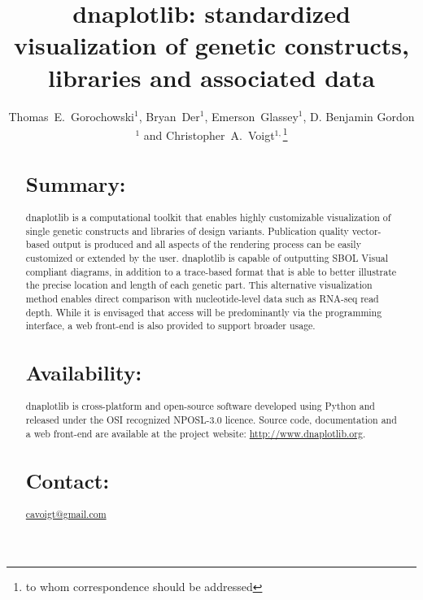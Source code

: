 \documentclass{bioinfo}
\begin{document}

\title[dnaplotlib]{dnaplotlib: standardized visualization of genetic constructs, libraries and associated data}
\author[Thomas E. Gorochowski \textit{et~al.}]{Thomas~E.~Gorochowski$^{1}$, Bryan~Der$^{1}$, Emerson~Glassey$^{1}$, D. Benjamin Gordon$^{1}$ and Christopher~A.~Voigt$^{1,}$\footnote{to whom correspondence should be addressed}}
\address{$^{1}$Department of Biological Engineering, Synthetic Biology Center, Massachusetts Institute of Technology, USA.}



\maketitle

\begin{abstract}

\section{Summary:}
dnaplotlib is a computational toolkit that enables highly customizable visualization of single genetic constructs and libraries of design variants. Publication quality vector-based output is produced and all aspects of the rendering process can be easily customized or extended by the user. dnaplotlib is capable of outputting SBOL Visual compliant diagrams, in addition to a trace-based format that is able to better illustrate the precise location and length of each genetic part. This alternative visualization method enables direct comparison with nucleotide-level data such as RNA-seq read depth. While it is envisaged that access will be predominantly via the programming interface, a web front-end is also provided to support broader usage.

\section{Availability:}
dnaplotlib is cross-platform and open-source software developed using Python and released under the OSI recognized NPOSL-3.0 licence. Source code, documentation and a web front-end are available at the project website: \href{http://www.dnaplotlib.org}{http://www.dnaplotlib.org}.

\section{Contact:} \href{cavoigt@gmail.com}{cavoigt@gmail.com}
\end{abstract}
\end{document}
